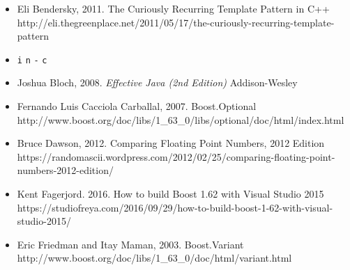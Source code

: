 \begin{itemize}

\item Eli Bendersky, 2011. The Curiously Recurring Template Pattern in C++ http://\allowbreak{}eli.\allowbreak{}thegreenplace.\allowbreak{}net/\allowbreak{}2011/\allowbreak{}05/\allowbreak{}17/\allowbreak{}the-\allowbreak{}curiously-\allowbreak{}recurring-\allowbreak{}template-\allowbreak{}pattern



\item \texttt{i} \texttt{n} \texttt{-} \texttt{c}



\item Joshua Bloch, 2008. \textit{Effective Java (2nd Edition)} Addison-Wesley



\item Fernando Luis Cacciola Carballal, 2007. Boost.Optional http://\allowbreak{}www.\allowbreak{}boost.\allowbreak{}org/\allowbreak{}doc/\allowbreak{}libs/\allowbreak{}1\_\allowbreak{}63\_\allowbreak{}0/\allowbreak{}libs/\allowbreak{}optional/\allowbreak{}doc/\allowbreak{}html/\allowbreak{}index.\allowbreak{}html



\item Bruce Dawson, 2012. Comparing Floating Point Numbers, 2012 Edition https://\allowbreak{}randomascii.\allowbreak{}wordpress.\allowbreak{}com/\allowbreak{}2012/\allowbreak{}02/\allowbreak{}25/\allowbreak{}comparing-\allowbreak{}floating-\allowbreak{}point-\allowbreak{}numbers-\allowbreak{}2012-\allowbreak{}edition/



\item Kent Fagerjord. 2016. How to build Boost 1.62 with Visual Studio 2015 https://\allowbreak{}studiofreya.\allowbreak{}com/\allowbreak{}2016/\allowbreak{}09/\allowbreak{}29/\allowbreak{}how-\allowbreak{}to-\allowbreak{}build-\allowbreak{}boost-\allowbreak{}1-\allowbreak{}62-\allowbreak{}with-\allowbreak{}visual-\allowbreak{}studio-\allowbreak{}2015/



\item Eric Friedman and Itay Maman, 2003. Boost.Variant http://\allowbreak{}www.\allowbreak{}boost.\allowbreak{}org/\allowbreak{}doc/\allowbreak{}libs/\allowbreak{}1\_\allowbreak{}63\_\allowbreak{}0/\allowbreak{}doc/\allowbreak{}html/\allowbreak{}variant.\allowbreak{}html



\end{itemize}

